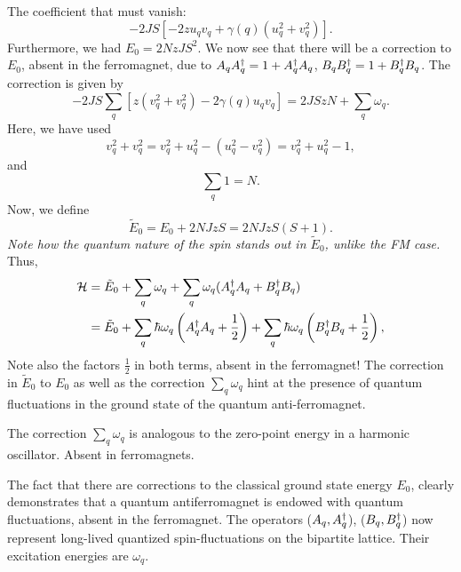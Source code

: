 The coefficient that must vanish:
\begin{equation}
	-2JS\left [-2zu_{q}v_{q} + \gamma(q)(u_{q}^{2} + v_{q}^{2})\right ].
\end{equation}
Furthermore, we had $E_0 = 2NzJS^2$. We now see that there will be a correction to $E_0$, absent in the ferromagnet, due to $A_{q}A_{q}^{\dagger} = 1 + A_{q}^{\dagger}A_{q}$, $B_{q}B_{q}^{\dagger} =1+ B_{q}^{\dagger}B_{q}$. The correction is given by
\begin{equation}
	-2JS\sum_{q}\left [z(v_{q}^2 + v_{q}^2) - 2\gamma(q)u_{q}v_{q}\right ] = 2JSz N + \sum_{q}\omega_q.
\end{equation}
Here, we have used
\begin{equation}
	v_{q}^2 + v_{q}^2 = v_{q}^2 + u_{q}^2 -(u_{q}^2-v_{q}^2) = v_{q}^2 + u_q^2 - 1,
\end{equation}
and
\begin{equation}
	\sum_{q}1 = N.
\end{equation}
Now, we define
\begin{equation}
	\tilde{E}_0 = E_0 + 2NJzS = 2NJzS(S+1).
\end{equation}
\emph{Note how the quantum nature of the spin stands out in $\tilde{E}_0$, unlike the FM case.}
Thus, 
\begin{align}
	\mathcal{H} &= \tilde{E}_0 + \sum_q \omega_q + \sum_q\omega_q(A_{q}^{\dagger}A_{q} + B_{q}^{\dagger}B_{q}) \\
	&= \tilde{E}_0 +\sum_{q}\hbar\omega_q\left (A_{q}^{\dagger}A_{q} + \frac{1}{2}\right ) + \sum_{q}\hbar\omega_q\left (B_{q}^{\dagger}B_{q} + \frac{1}{2}\right ),
\end{align}
Note also the factors $\frac12$ in both terms, absent in the ferromagnet!
The correction in $\tilde{E}_0$ to $E_0$ as well as the correction $\sum_q\omega_q$ hint at the presence of quantum fluctuations in the ground state of the quantum anti-ferromagnet.
\begin{tcolorbox}
	The correction $\sum_q\omega_q$ is analogous to the zero-point energy in a harmonic oscillator. Absent in ferromagnets.
\end{tcolorbox}
The fact that there are corrections to the classical ground state energy $E_0$, clearly demonstrates that a quantum antiferromagnet is endowed with quantum fluctuations, absent in the ferromagnet. 
The operators ($A_{q},A_{q}^{\dagger}$), ($B_{q}, B_{q}^{\dagger}$) now represent long-lived quantized spin-fluctuations on the bipartite lattice. Their excitation energies are $\omega_q$.  
